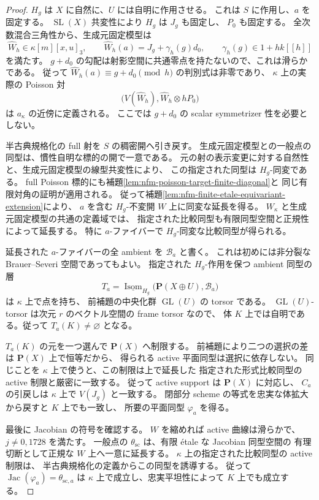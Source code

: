 \begin{proof}
$H_g$ は $X$ に自然に、$U$ には自明に作用させる。
これは $S$ に作用し、$a$ を固定する。
$\operatorname{SL}(X)$ 共変性により $H_g$ は $J_g$ も固定し、
$P_0$ も固定する。
全次数混合三角性から、生成元固定模型は
\[
 \widehat W_h\in\kappa[m][x,u]_3,\qquad
 \widehat W_h(a)=J_g+\gamma_h(g)d_0,\qquad
 \gamma_h(g)\in1+h k[[h]]
\]
を満たす。
$g+d_0$ の勾配は射影空間に共通零点を持たないので、これは滑らかである。
従って $\widehat W_h(a)\equiv g+d_0\pmod h$ の判別式は非零であり、
$\kappa$ 上の実際の Poisson 対
\[
 \bigl(V(\widehat W_h),\widehat W_h\otimes hP_0\bigr)
\]
は $a_\kappa$ の近傍に定義される。
ここでは $g+d_0$ の scalar symmetrizer 性を必要としない。

半古典規格化の full 射を $S$ の稠密開へ引き戻す。
生成元固定模型との一般点の同型は、慣性自明な標的の開で一意である。
元の射の表示変更に対する自然性と、生成元固定模型の線型共変性により、
この指定された同型は $H_g$-同変である。
full Poisson 標的にも補題\ref{lem:nfm-poisson-target-finite-diagonal}と
同じ有限対角の証明が適用される。
従って補題\ref{lem:nfm-finite-etale-equivariant-extension}により、
$a$ を含む $H_g$-不変開 $W$ 上に同変な延長を得る。
$W_\kappa$ と生成元固定模型の共通の定義域では、
指定された比較同型も有限同型空間と正規性によって延長する。
特に $a$-ファイバーで $H_g$-同変な比較同型が得られる。

延長された $a$-ファイバーの全 ambient を $\mathcal B_a$ と書く。
これは初めには非分裂な Brauer--Severi 空間であってもよい。
指定された $H_g$-作用を保つ ambient 同型の層
\[
 T_a=\underline{\operatorname{Isom}}_{H_g}
       \bigl(\mathbf P(X\oplus U),\mathcal B_a\bigr)
\]
は $\kappa$ 上で点を持ち、
前補題の中央化群 $\operatorname{GL}(U)$ の torsor である。
$\operatorname{GL}(U)$-torsor は次元 $r$ のベクトル空間の frame torsor なので、
体 $K$ 上では自明である。従って $T_a(K)\ne\varnothing$ となる。

$T_a(K)$ の元を一つ選んで $\mathbf P(X)$ へ制限する。
前補題により二つの選択の差は $\mathbf P(X)$ 上で恒等だから、
得られる active 平面同型は選択に依存しない。
同じことを $\kappa$ 上で使うと、この制限は上で延長した
指定された形式比較同型の active 制限と厳密に一致する。
従って active support は $\mathbf P(X)$ に対応し、
$C_a$ の引戻しは $\kappa$ 上で $V(J_g)$ と一致する。
閉部分 scheme の等式を忠実な体拡大から戻すと $K$ 上でも一致し、
所要の平面同型 $\varphi_a$ を得る。

最後に Jacobian の符号を確認する。
$W$ を縮めれば active 曲線は滑らかで、$j\ne0,1728$ を満たす。
一般点の $\theta_{\mathrm{sc}}$ は、有限 étale な Jacobian 同型空間の
有理切断として正規な $W$ 上へ一意に延長する。
$\kappa$ 上の指定された比較同型の active 制限は、
半古典規格化の定義からこの同型を誘導する。
従って $\operatorname{Jac}(\varphi_a)=\theta_{\mathrm{sc},a}$ は
$\kappa$ 上で成立し、忠実平坦性によって $K$ 上でも成立する。
\end{proof}


